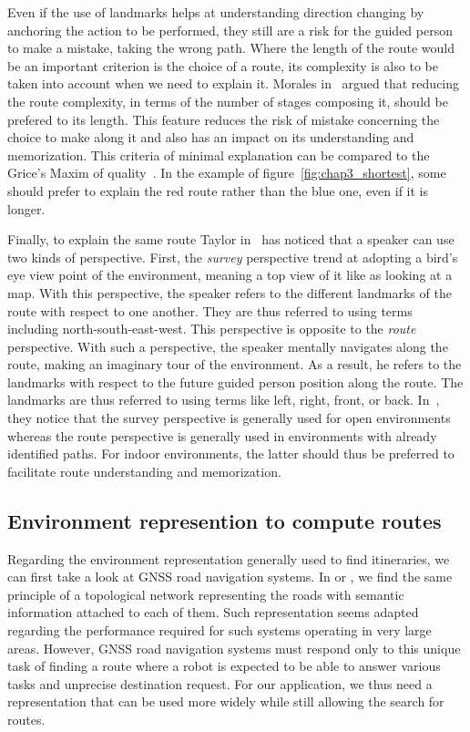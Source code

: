 Even if the use of landmarks helps at understanding direction changing by anchoring the action to be performed, they still are a risk for the guided person to make a mistake, taking the wrong path. Where the length of the route would be an important criterion is the choice of a route, its complexity is also to be taken into account when we need to explain it. Morales in~\cite{morales_2015_building} argued that reducing the route complexity, in terms of the number of stages composing it, should be prefered to its length. This feature reduces the risk of mistake concerning the choice to make along it and also has an impact on its understanding and memorization. This criteria of minimal explanation can be compared to the Grice's Maxim of quality~\cite{grice_1975_logic}. In the example of figure~\ref{fig:chap3_shortest}, some should prefer to explain the red route rather than the blue one, even if it is longer.

Finally, to explain the same route Taylor in~\cite{taylor_1992_spatial} has noticed that a speaker can use two kinds of perspective. First, the \textit{survey} perspective trend at adopting a bird's eye view point of the environment, meaning a top view of it like as looking at a map. With this perspective, the speaker refers to the different landmarks of the route with respect to one another. They are thus referred to using terms including north-south-east-west. This perspective is opposite to the \textit{route} perspective. With such a perspective, the speaker mentally navigates along the route, making an imaginary tour of the environment. As a result, he refers to the landmarks with respect to the future guided person position along the route. The landmarks are thus referred to using terms like left, right, front, or back. In~\cite{taylor_1996_perspective}, they notice that the survey perspective is generally used for open environments whereas the route perspective is generally used in environments with already identified paths. For indoor environments, the latter should thus be preferred to facilitate route understanding and memorization.

\subsection{Environment represention to compute routes}

Regarding the environment representation generally used to find itineraries, we can first take a look at GNSS road navigation systems. In \cite{liu_1997_route} or \cite{cao_2009_gps}, we find the same principle of a topological network representing the roads with semantic information attached to each of them. Such representation seems adapted regarding the performance required for such systems operating in very large areas. However, GNSS road navigation systems must respond only to this unique task of finding a route where a robot is expected to be able to answer various tasks and unprecise destination request. For our application, we thus need a representation that can be used more widely while still allowing the search for routes.

